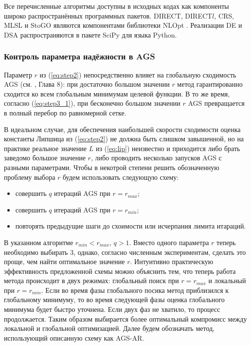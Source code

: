 Все перечисленные алгоритмы доступны в исходных кодах как компоненты широко распространённых программных пакетов.
DIRECT, DIRECT$l$, CRS, MLSL и StoGO являются компонентами библиотеки NLOpt \cite{nlopt}.
Реализации DE и DSA распространяются в пакете SciPy \cite{scipy} для языка Python.

\subsubsection{Контроль параметра надёжности в AGS}

Параметр $r$ из (\ref{eq:step2}) непосредственно влияет на глобальную сходимость AGS (см. \cite{Strongin2000}, Глава 8):
при достаточно большом значении $r$ метод гарантированно сходится ко всем глобальным минимумам целевой функции.
В то же время, согласно (\ref{eq:step3_1}), при бесконечно большом значении $r$ AGS превращается в полный перебор
по равномерной сетке.

В идеальном случае, для обеспечения наибольшей скорости сходимости оценка константы Липшица из (\ref{eq:step2})
не должна быть слишком завышенной, но на практике реальное значение $L$ из (\ref{eq:lip}) неизвестно и приходится
либо брать заведомо большое значение $r$, либо проводить несколько запусков AGS с разными параметрами. Чтобы в некотрой
степени решить обозначенную проблему выбора $r$ будем использовать следующую схему:
\begin{itemize}
  \item совершить $q$ итераций AGS при $r=r_{max}$;
  \item совершить $q$ итераций AGS при $r=r_{min}$;
  \item повторять предыдущие шаги до схоимости или исчерпания лимита итараций.
\end{itemize}

В указанном алгоритме $r_{min} < r_{max}$, $q > 1$. Вместо одного параметра $r$ теперь
необходимо выбирать 3, однако, согласно численным экспериментам, сделать это проще, чем найти оптимальное значение $r$.
Интуитивно практическую эффективность предложенной схемы можно объяснить тем, что теперь работа метода происходит в
двух режимах: глобальный поиск при $r=r_{max}$ и локальный при $r=r_{min}$. Если во время фазы глобального посика
метод приблизился к глобальному минимуму, то во время следующей фазы оценка глобального минимума будет быстро уточнена.
Если двух фаз не хватило, то процесс продолжается. Таким образом выбирается более оптимальный компромисс
между локальной и глобальной оптимизацией. Далее будем обозначать метод, использующий описанную схему как AGS-AR.

